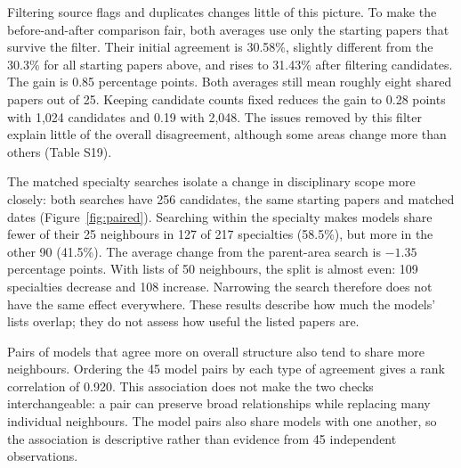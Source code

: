 \documentclass[12pt]{article}
\begin{document}
Filtering source flags and duplicates changes little of this picture. To make the before-and-after comparison fair, both averages use only the starting papers that survive the filter. Their initial agreement is 30.58\%, slightly different from the 30.3\% for all starting papers above, and rises to 31.43\% after filtering candidates. The gain is 0.85 percentage points. Both averages still mean roughly eight shared papers out of 25. Keeping candidate counts fixed reduces the gain to 0.28 points with 1,024 candidates and 0.19 with 2,048. The issues removed by this filter explain little of the overall disagreement, although some areas change more than others (Table S19).

The matched specialty searches isolate a change in disciplinary scope more closely: both searches have 256 candidates, the same starting papers and matched dates (Figure~\ref{fig:paired}). Searching within the specialty makes models share fewer of their 25 neighbours in 127 of 217 specialties (58.5\%), but more in the other 90 (41.5\%). The average change from the parent-area search is $-1.35$ percentage points. With lists of 50 neighbours, the split is almost even: 109 specialties decrease and 108 increase. Narrowing the search therefore does not have the same effect everywhere. These results describe how much the models' lists overlap; they do not assess how useful the listed papers are.

Pairs of models that agree more on overall structure also tend to share more neighbours. Ordering the 45 model pairs by each type of agreement gives a rank correlation of 0.920. This association does not make the two checks interchangeable: a pair can preserve broad relationships while replacing many individual neighbours. The model pairs also share models with one another, so the association is descriptive rather than evidence from 45 independent observations.
\end{document}
